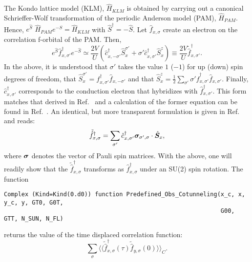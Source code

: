 The  Kondo lattice model (KLM), $\hat{H}_{KLM}$   is obtained by carrying out a   canonical Schrieffer-Wolf  \cite{Schrieffer66}  transformation  of the   periodic Anderson model (PAM), $\hat{H}_{PAM}$.    Hence, $e^{\hat{S}}  $ $\hat{H}_{PAM} $$ e^{-S}   = \hat{H}_{KLM}$  with  $\hat{S}^\dagger = - \hat{S}$.     Let $\hat{f}_{x,\sigma} $  create an  electron on the   correlation f-orbital of the   PAM.  Then, 
\begin{equation}
e^{\hat{S}} \hat{f}^{\dagger}_{x,\sigma'} e^{-\hat{S}}   \simeq  
\frac{2V}{U}  \left( \hat{c}^{\dagger}_{x,-\sigma'}  \hat{S}^{\sigma'}_{x} +  \sigma'   \hat{c}^{\dagger}_{x,\sigma'} \hat{S}^{z}_x   \right)  \equiv  \frac{2V}{U}   \tilde{\hat{f}}^{\dagger}_{x,\sigma'} .  
\end{equation}
In the above, it is understood that $\sigma'$ takes the value $1$ ($-1$)  for up  (down) spin degrees of freedom, that  $  \hat{S}^{\sigma'}_{x} =  f^{\dagger}_{x,\sigma'} \hat{f}^{}_{x,-\sigma'}  $  and that 
$ \hat{S}^{z}_{x} = \frac{1}{2} \sum_{\sigma'}  \sigma' \hat{f}^{\dagger}_{x,\sigma'} \hat{f}^{}_{x,\sigma'} $.  Finally, $\hat{c}^{\dagger}_{x,\sigma'}$ corresponds to the conduction electron that hybridizes with $\hat{f}^{\dagger}_{x,\sigma'}$.  This form matches that derived in Ref.~\cite{Costi00} and a  calculation  of the former equation can be found in Ref.~\cite{Raczkowski18}.  An identical, but more transparent formulation is given in  Ref.~\cite{Maltseva09}   and reads: 
\begin{equation}
\tilde{\hat{f}}^{\dagger}_{x,\sigma} = \sum_{\sigma'} \hat{c}^{\dagger}_{x,\sigma'} \boldsymbol{\sigma}_{\sigma',\sigma} \cdot  \hat{\boldsymbol{S}}_x,
\end{equation}
where $\ve{\sigma}$  denotes  the vector of Pauli spin matrices.    With the above,  one will readily show that the  $ \tilde{\hat{f}}^{\dagger}_{x,\sigma} $  transforms as  $ \hat{f}^{\dagger}_{x,\sigma} $   under an SU(2)  spin rotation. 
The  function 
\begin{lstlisting}[style=fortran]
Complex (Kind=Kind(0.d0)) function Predefined_Obs_Cotunneling(x_c, x, y_c, y, GT0, G0T,
                                                              G00, GTT, N_SUN, N_FL)
\end{lstlisting}
returns the   value of the time displaced correlation function: 
\begin{equation}
\sum_{\sigma} \langle \langle   \tilde{\hat{f}}^{\dagger}_{x,\sigma}(\tau)  \tilde{\hat{f}}_{y,\sigma}(0)   \rangle \rangle_{C} .
\end{equation}
$$

